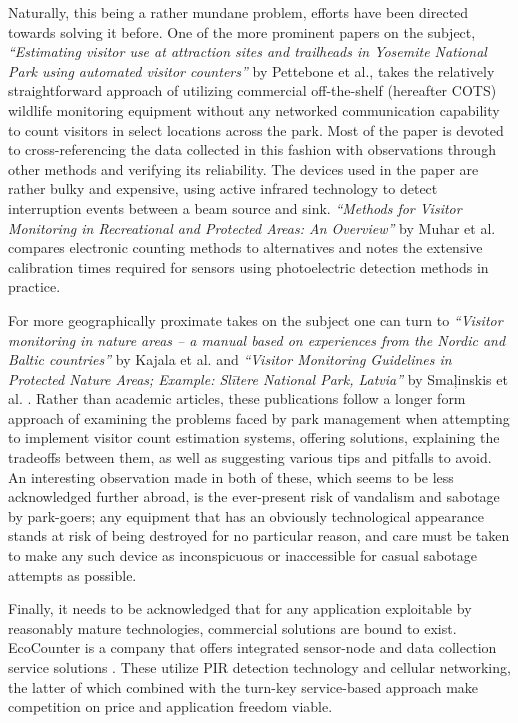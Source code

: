 \documentclass[10pt,nocopyrightspace]{ewsn-proc}
\begin{document}
Naturally, this being a rather mundane problem, efforts have been directed towards solving it before. One of the more prominent papers on the subject, \textit{“Estimating visitor use at attraction sites and trailheads in Yosemite National Park using automated visitor counters”} by Pettebone et al.\cite{Pettebone:Yosemite}, takes the relatively straightforward approach of utilizing commercial off-the-shelf (hereafter COTS) wildlife monitoring equipment without any networked communication capability to count visitors in select locations across the park. Most of the paper is devoted to cross-referencing the data collected in this fashion with observations through other methods and verifying its reliability. The devices used in the paper are rather bulky and expensive, using active infrared technology to detect interruption events between a beam source and sink. \textit{“Methods for Visitor Monitoring in Recreational and Protected Areas:
An Overview”} by Muhar et al. \cite{Muhar:Methods} compares electronic counting methods to alternatives and notes the extensive calibration times required for sensors using photoelectric detection methods in practice. 

For more geographically proximate takes on the subject one can turn to \textit{“Visitor monitoring in nature areas – a manual based on experiences from the Nordic and Baltic countries”} by Kajala et al. \cite{Kajala:Baltic} and \textit{“Visitor Monitoring Guidelines in Protected Nature Areas; Example: Slītere National Park, Latvia”} by Smaļinskis et al. \cite{Slitere}. Rather than academic articles, these publications follow a longer form approach of examining the problems faced by park management when attempting to implement visitor count estimation systems, offering solutions, explaining the tradeoffs between them, as well as suggesting various tips and pitfalls to avoid. An interesting observation made in both of these, which seems to be less acknowledged further abroad, is the ever-present risk of vandalism and sabotage by park-goers; any equipment that has an obviously technological appearance stands at risk of being destroyed for no particular reason, and care must be taken to make any such device as inconspicuous or inaccessible for casual sabotage attempts as possible.

Finally, it needs to be acknowledged that for any application exploitable by reasonably mature technologies, commercial solutions are bound to exist. EcoCounter is a company that offers integrated sensor-node and data collection service solutions \cite{EcoCounter}. These utilize PIR detection technology and cellular networking, the latter of which combined with the turn-key service-based approach make competition on price and application freedom viable.
 
\end{document}
